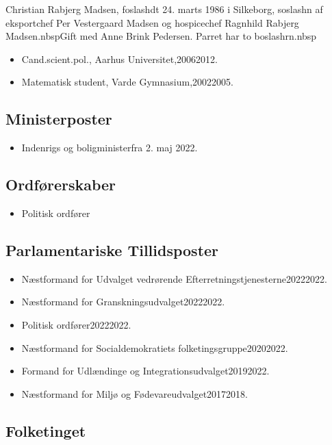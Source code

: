 \documentclass[11pt, a4paper]{awesome-cv}
\begin{document}
\makecvheader[R]
\makelettertitle
\begin{cvletter}
Christian Rabjerg Madsen, foslashdt 24. marts 1986 i Silkeborg, soslashn af eksportchef Per Vestergaard Madsen og hospicechef Ragnhild Rabjerg Madsen.nbspGift med Anne Brink Pedersen. Parret har to boslashrn.nbsp

\begin{itemize}
\item Cand.scient.pol., Aarhus Universitet,20062012.
\item Matematisk student, Varde Gymnasium,20022005.
\end{itemize}
\subsection*{Ministerposter}
\begin{itemize}
\item Indenrigs og boligministerfra 2. maj 2022.
\end{itemize}
\subsection*{Ordførerskaber}
\begin{itemize}
\item Politisk ordfører
\end{itemize}
\subsection*{Parlamentariske Tillidsposter}
\begin{itemize}
\item Næstformand for Udvalget vedrørende Efterretningstjenesterne20222022.
\item Næstformand for Granskningsudvalget20222022.
\item Politisk ordfører20222022.
\item Næstformand for Socialdemokratiets folketingsgruppe20202022.
\item Formand for Udlændinge og Integrationsudvalget20192022.
\item Næstformand for Miljø og Fødevareudvalget20172018.
\end{itemize}
\subsection*{Folketinget}

\end{cvletter}
\end{document}
